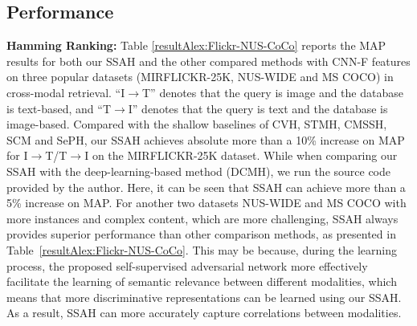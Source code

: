 \documentclass[10pt,twocolumn,letterpaper]{article}
\begin{document}
\subsection{Performance}
\vspace{-0.2cm}
\textbf{Hamming Ranking:} Table \ref{resultAlex:Flickr-NUS-CoCo} reports the MAP results for both our SSAH and the other compared methods with CNN-F features on three popular datasets (MIRFLICKR-25K, NUS-WIDE and MS COCO) in cross-modal retrieval. ``I$\rightarrow$T'' denotes that the query is image and the database is text-based, and ``T$\rightarrow$I'' denotes that the query is text and the database is image-based. Compared with the shallow baselines of CVH, STMH, CMSSH, SCM and SePH, our SSAH achieves absolute more than a 10\% increase on MAP for I$\rightarrow$T/T$\rightarrow$I on the MIRFLICKR-25K dataset. While when comparing our SSAH with the deep-learning-based method (DCMH), we run the source code provided by the author. Here, it can be seen that SSAH can achieve more than a 5\% increase on MAP. For another two datasets NUS-WIDE and MS COCO with more instances and complex content, which are more challenging, SSAH always provides superior performance than other comparison methods, as presented in Table~\ref{resultAlex:Flickr-NUS-CoCo}. This may be because, during the learning process, the proposed self-supervised adversarial network more effectively facilitate the learning of semantic relevance between different modalities, which means that more discriminative representations can be learned using our SSAH. As a result, SSAH can more accurately capture correlations between modalities.
\end{document}
